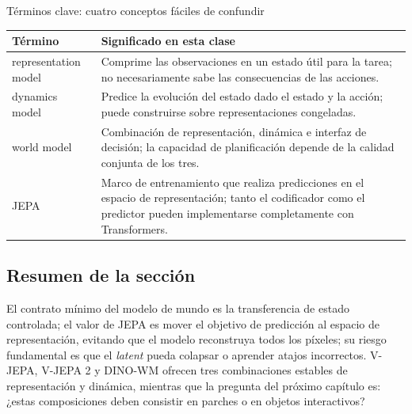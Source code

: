 \begin{knowledgebox}{Términos clave: cuatro conceptos fáciles de confundir}
\begin{tabularx}{\textwidth}{L{0.20\textwidth} X}
\toprule
Término & Significado en esta clase \\
\midrule
representation model & Comprime las observaciones en un estado útil para la tarea; no necesariamente sabe las consecuencias de las acciones. \\
dynamics model & Predice la evolución del estado dado el estado y la acción; puede construirse sobre representaciones congeladas. \\
world model & Combinación de representación, dinámica e interfaz de decisión; la capacidad de planificación depende de la calidad conjunta de los tres. \\
JEPA & Marco de entrenamiento que realiza predicciones en el espacio de representación; tanto el codificador como el predictor pueden implementarse completamente con Transformers. \\
\bottomrule
\end{tabularx}
\end{knowledgebox}

\subsection{Resumen de la sección}

El contrato mínimo del modelo de mundo es la transferencia de estado controlada; el valor de JEPA es mover el objetivo de predicción al espacio de representación, evitando que el modelo reconstruya todos los píxeles; su riesgo fundamental es que el \textit{latent} pueda colapsar o aprender atajos incorrectos. V-JEPA, V-JEPA 2 y DINO-WM ofrecen tres combinaciones estables de representación y dinámica, mientras que la pregunta del próximo capítulo es: ¿estas composiciones deben consistir en parches o en objetos interactivos?
